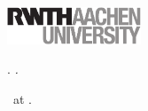 \begin{titlepage}
	\begin{addmargin}[-1cm]{-3cm}
    \begin{center}
        \large  

        \hfill

        \vfill

        \begingroup
            \spacedlowsmallcaps{\myName}\\ \bigskip
            \huge\spacedallcaps{\myTitle}\\ \bigskip
            \Large\itshape\mySubtitle \vspace{10cm}
        \endgroup

        \vfill                      

    \end{center}  
  \end{addmargin}       
\end{titlepage}


\thispagestyle{empty}

\noindent\includegraphics[width=4cm]{gfx/rwth_sw}

\hfill

\vfill

\noindent\myName. \textit{\myTitle.}

\medskip

\noindent \myDegree\ at \myFaculty.

\medskip

\noindent{}

\bigskip\bigskip\bigskip\bigskip

\noindent{} \\
\myProf

\medskip

\noindent{} \\
\myOtherProf

\bigskip

\noindent{} \\
\mySupervisor\\
\myOtherSupervisor

